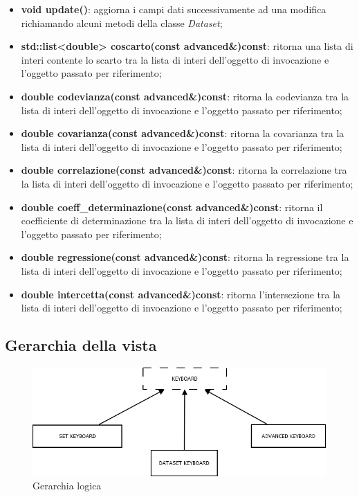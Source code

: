 \documentclass[a4paper,10pt]{article}
\begin{document}
    \begin{itemize}
        \item \textbf{void update()}: aggiorna i campi dati successivamente ad una modifica richiamando alcuni metodi della classe \textit{Dataset};
        \item \textbf{std::list<double> coscarto(const advanced\&)const}: ritorna una lista di interi contente lo scarto tra la lista di interi dell'oggetto di invocazione e l'oggetto passato per riferimento;
        \item \textbf{double codevianza(const advanced\&)const}: ritorna la codevianza tra la lista di interi dell'oggetto di invocazione e l'oggetto passato per riferimento;
        \item \textbf{double covarianza(const advanced\&)const}: ritorna la covarianza tra la lista di interi dell'oggetto di invocazione e l'oggetto passato per riferimento;
        \item \textbf{double correlazione(const advanced\&)const}: ritorna la correlazione tra la lista di interi dell'oggetto di invocazione e l'oggetto passato per riferimento;
        \item \textbf{double coeff\_determinazione(const advanced\&)const}: ritorna il coefficiente di determinazione tra la lista di interi dell'oggetto di invocazione e l'oggetto passato per riferimento;
        \item \textbf{double regressione(const advanced\&)const}: ritorna la regressione tra la lista di interi dell'oggetto di invocazione e l'oggetto passato per riferimento;
        \item \textbf{double intercetta(const advanced\&)const}: ritorna l'intersezione tra la lista di interi dell'oggetto di invocazione e l'oggetto passato per riferimento;
    \end{itemize}
	\newpage
    \subsection{Gerarchia della vista}
    \begin{figure}[!h]
		\begin{center} \includegraphics[scale=0.5]{img/Diagramma2.png}
			\caption{Gerarchia logica}
		\end{center}
	\end{figure}
\end{document}
